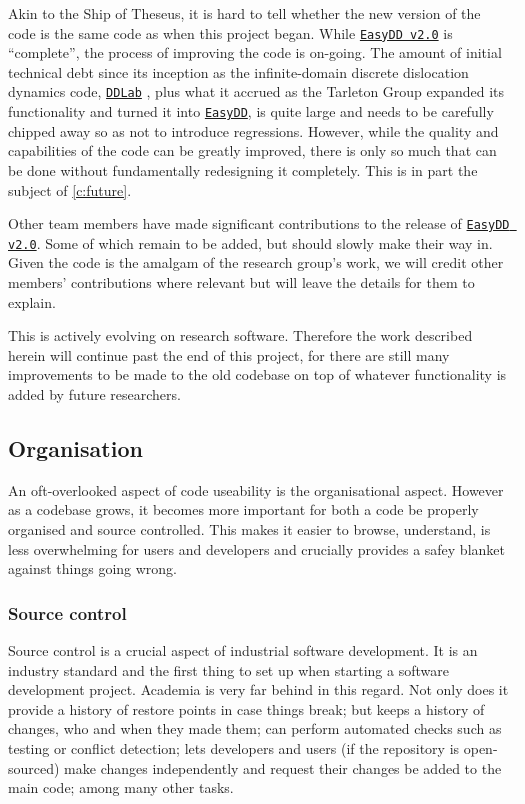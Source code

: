 Akin to the Ship of Theseus, it is hard to tell whether the new version of the code is the same code as when this project began. While \href{https://github.com/TarletonGroup/EasyDD}{\texttt{EasyDD v2.0}} is ``complete'', the process of improving the code is on-going. The amount of initial technical debt since its inception as the infinite-domain discrete dislocation dynamics code, \href{http://micro.stanford.edu/wiki/Main_Page}{\texttt{DDLab}} \cite{ddlab}, plus what it accrued as the Tarleton Group expanded its functionality and turned it into \href{https://github.com/TarletonGroup/EasyDD/tree/65907b022d1fe408fc1b2e5c5ca2bd1797ccae04}{\texttt{EasyDD}}, is quite large and needs to be carefully chipped away so as not to introduce regressions. However, while the quality and capabilities of the code can be greatly improved, there is only so much that can be done without fundamentally redesigning it completely. This is in part the subject of \cref{c:future}.

Other team members have made significant contributions to the release of \href{https://github.com/TarletonGroup/EasyDD}{\texttt{EasyDD v2.0}}. Some of which remain to be added, but should slowly make their way in. Given the code is the amalgam of the research group's work, we will credit other members' contributions where relevant but will leave the details for them to explain.

This is actively evolving on research software. Therefore the work described herein will continue past the end of this project, for there are still many improvements to be made to the old codebase on top of whatever functionality is added by future researchers.

\subsection{Organisation}

An oft-overlooked aspect of code useability is the organisational aspect. However as a codebase grows, it becomes more important for both a code be properly organised and source controlled. This makes it easier to browse, understand, is less overwhelming for users and developers and crucially provides a safey blanket against things going wrong.

\subsubsection{Source control}

Source control is a crucial aspect of industrial software development. It is an industry standard and the first thing to set up when starting a software development project. Academia is very far behind in this regard. Not only does it provide a history of restore points in case things break; but keeps a history of changes, who and when they made them; can perform automated checks such as testing or conflict detection; lets developers and users (if the repository is open-sourced) make changes independently and request their changes be added to the main code; among many other tasks.

